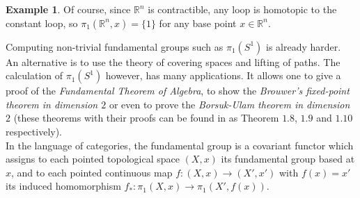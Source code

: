\documentclass{article}
\theoremstyle{plain}
\newtheorem{theorem}{Theorem}[subsection]
\theoremstyle{definition}
\newtheorem{example}[theorem]{Example}
\begin{document}
\begin{example}
Of course, since $\mathbb{R}^n$ is contractible, any loop is homotopic to the constant loop, so $\pi_1(\mathbb{R}^n,x) = \{1\}$ for any base point $x\in\mathbb{R}^n$.
\end{example}

\noindent Computing non-trivial fundamental groups such as $\pi_1(S^1)$ is already harder. An alternative is to use the theory of covering spaces and lifting of paths.
The calculation of $\pi_1(S^1)$ however, has many applications. It allows one to give a proof of the \textit{Fundamental Theorem of Algebra}, to show the \textit{Brouwer's fixed-point theorem in dimension $2$} or even to prove the \textit{Borsuk-Ulam theorem in dimension $2$} (these theorems with their proofs can be found in \cite{Hatcher} as Theorem $1.8$, $1.9$ and $1.10$ respectively).\\


\noindent In the language of categories, the fundamental group is a covariant functor which assigns to each pointed topological space $(X,x)$ its fundamental group based at $x$, and to each pointed continuous map $f:(X,x)\rightarrow(X',x')$ with $f(x)=x'$ its induced homomorphism $f_{*}:\pi_1(X,x)\rightarrow \pi_1(X',f(x))$.\\

\end{document}
